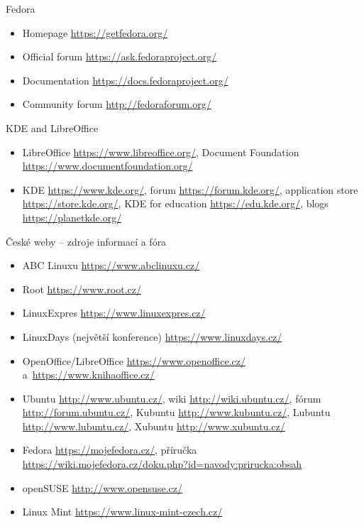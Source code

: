 \documentclass[compress, ucs, xelatex, 11pt, xcolor=svgnames,
  hyperref={
    bookmarks=true,
    unicode=true,
    colorlinks=true,
    pdftitle={Linux, command line and MetaCentrum},
    plainpages=false,
    pdfauthor={Vojtech Zeisek},
    pdfsubject={Course about use of Linux command line, writing shell scripts and using MetaCentrum of CESNET},
    pdfcreator={XeLaTeX},
    pdfkeywords={Linux, GNU, BASH, shell, command line, MetaCentrum},
    linkcolor=DarkRed,
    anchorcolor=DarkBlue,
    citecolor=Indigo,
    filecolor=NavyBlue,
    menucolor=DarkMagenta,
    urlcolor=DarkBlue,
    pdftex},
  url={hyphens, lowtilde} %
  ]{beamer}
\begin{document}
\begin{frame}{Fedora}
  \begin{itemize}
    \item Homepage \url{https://getfedora.org/}
    \item Official forum \url{https://ask.fedoraproject.org/}
    \item Documentation \url{https://docs.fedoraproject.org/}
    \item Community forum \url{http://fedoraforum.org/}
  \end{itemize}
\end{frame}

\begin{frame}{KDE and LibreOffice}
  \begin{itemize}
    \item LibreOffice \url{https://www.libreoffice.org/}, Document Foundation \url{https://www.documentfoundation.org/}
    \item KDE \url{https://www.kde.org/}, forum \url{https://forum.kde.org/}, application store \url{https://store.kde.org/}, KDE for education \url{https://edu.kde.org/}, blogs \url{https://planetkde.org/}
  \end{itemize}
\end{frame}

\begin{frame}{České weby -- zdroje informací a fóra}
  \begin{itemize}
    \item ABC Linuxu \url{https://www.abclinuxu.cz/}
    \item Root \url{https://www.root.cz/}
    \item LinuxExpres \url{https://www.linuxexpres.cz/}
    \item LinuxDays (největší konference) \url{https://www.linuxdays.cz/}
    \item OpenOffice/LibreOffice \url{https://www.openoffice.cz/} a~\url{https://www.knihaoffice.cz/}
    \item Ubuntu \url{http://www.ubuntu.cz/}, wiki \url{http://wiki.ubuntu.cz/}, fórum \url{http://forum.ubuntu.cz/}, Kubuntu \url{http://www.kubuntu.cz/}, Lubuntu \url{http://www.lubuntu.cz/}, Xubuntu \url{http://www.xubuntu.cz/}
    \item Fedora \url{https://mojefedora.cz/}, příručka \url{https://wiki.mojefedora.cz/doku.php?id=navody:prirucka:obsah}
    \item openSUSE \url{http://www.opensuse.cz/}
    \item Linux Mint \url{https://www.linux-mint-czech.cz/}
  \end{itemize}
\end{frame}
\end{document}
